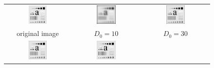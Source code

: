 \documentclass[11pt,a4paper]{article}
\begin{document}
\begin{figure}[!htbp]
	\centering
	\begin{tabular}{ccc} 
		\includegraphics[width=0.3\textwidth]{pro3/org}&
		\includegraphics[width=0.3\textwidth]{pro3/GLPF/GLPF_10}&
		\includegraphics[width=0.3\textwidth]{pro3/GLPF/GLPF_30} \\
		original image &  $D_0=10$ &  $D_0=30$\\
		\includegraphics[width=0.3\textwidth]{pro3/GLPF/GLPF_60}&
		\includegraphics[width=0.3\textwidth]{pro3/GLPF/GLPF_160}&

\end{tabular}
\end{figure}
\end{document}
